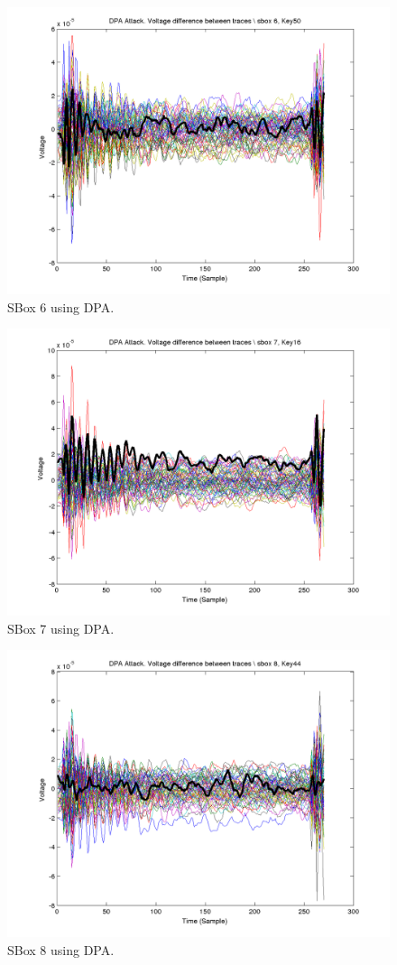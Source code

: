   \begin{figure}[]
  \includegraphics[width=0.9\linewidth]{./dpa6}
  \caption{SBox 6 using DPA.}
  \label{fig:dpa6}
  \end{figure}
  
  \begin{figure}[]
  \includegraphics[width=0.9\linewidth]{./dpa7}
  \caption{SBox 7 using DPA.}
  \label{fig:dpa7}
  \end{figure}
  
  \begin{figure}[]
  \includegraphics[width=0.9\linewidth]{./dpa8}
  \caption{SBox 8 using DPA.}
  \label{fig:dpa8}
  \end{figure}
  
